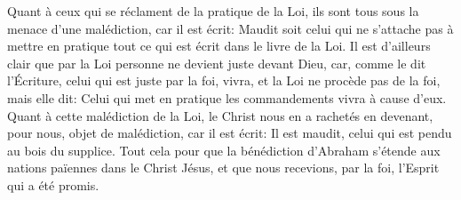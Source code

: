 Quant à ceux qui se réclament de la pratique de la Loi,
	ils sont tous sous la menace d’une malédiction, car il est écrit:
	Maudit soit celui qui ne s’attache pas à mettre en pratique
		tout ce qui est écrit dans le livre de la Loi.
Il est d’ailleurs clair que par la Loi personne ne devient juste devant Dieu,
	car, comme le dit l’Écriture, celui qui est juste par la foi, vivra,
	et la Loi ne procède pas de la foi, mais elle dit:
	Celui qui met en pratique les commandements vivra à cause d’eux.
Quant à cette malédiction de la Loi, le Christ nous en a rachetés
	en devenant, pour nous, objet de malédiction, car il est écrit:
	Il est maudit, celui qui est pendu au bois du supplice.
Tout cela pour que la bénédiction d’Abraham
		s’étende aux nations païennes dans le Christ Jésus,
	et que nous recevions, par la foi, l’Esprit qui a été promis.

